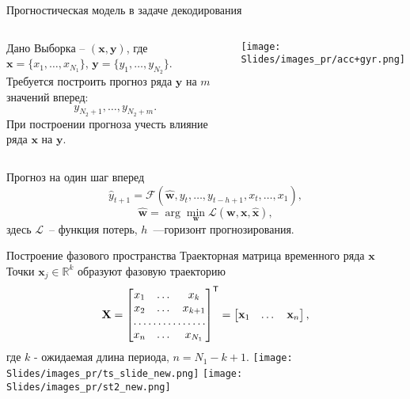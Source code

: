 \documentclass[9pt]{beamer}
\newcommand{\bx}{\mathbf{x}}
\newcommand{\by}{\mathbf{y}}
\newcommand{\bw}{\mathbf{w}}
\begin{document}
\begin{frame}{Прогностическая модель в задаче декодирования}
\begin{columns}
\begin{block}{Дано}
	\vspace{0.1cm}
	Выборка -- $\left( \bx, \by \right)$,\; где \quad
	$\bx = \{ x_1,\dots, x_{N_1}\}$,\quad
	$\by = \{ y_1,\dots, y_{N_2}\}$.\\
	\vspace{0.3cm}
	Требуется построить прогноз ряда $\by$ на $m$ значений вперед:   \[y_{N_2 + 1},\dots, y_{N_2 + m}.\]
	При построении прогноза учесть влияние ряда $\bx$ на $\by$.
	\end{block}
\vspace{0.3cm}
\texttt{[image: Slides/images\_pr/acc+gyr.png]}
\end{columns} 
\vspace{-0.2cm}
\begin{block}{Прогноз на один шаг вперед}
    \vspace{-0.1cm}
	\[
		\hat{y}_{t+1} = \mathcal{F}(\hat{\bw}, y_t,\dots,y_{t-h+1}, x_t,\dots,x_1),
	\]
	\[
	    \hat{\bw} = \arg\min_{\bw} \mathcal{L}(\bw, \bx, \hat{\bx}),
	\]
	здесь $\mathcal{L}$~-- функция потерь, $h$~---горизонт прогнозирования.
\end{block}	
	

	
\end{frame}
\begin{frame}{Построение фазового пространства}
\vspace{0.3cm}
Траекторная матрица временного ряда $\bx$\\
Точки $\bx_j\in\mathbb{R}^k$\; образуют фазовую траекторию
\vspace{0.2cm}
        \[ \mbox{\bfseries X} = \begin{bmatrix}
                        x_1 & \dots & x_k \\
                        x_2 & \dots & x_{k+1} \\
                        \hdotsfor{3} \\
                        x_{n} & \dots & x_{N_1}
                        \end{bmatrix}^{\mathsf{T}} = \begin{bmatrix} \bx_1 & \dots & \bx_{n} \end{bmatrix},\]
\vspace{0.1cm}
где $k$ - ожидаемая длина периода, $n = N_1 - k + 1$.                        
\hfil\hfil\texttt{[image: Slides/images\_pr/ts\_slide\_new.png]}
\hfil\hfil\texttt{[image: Slides/images\_pr/st2\_new.png]}


\end{frame}
\end{document}
